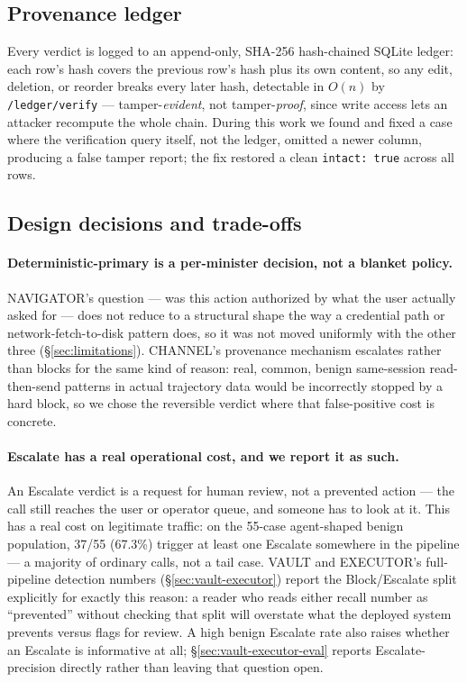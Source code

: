 \subsection{Provenance ledger}
\label{sec:provenance}

Every verdict is logged to an append-only, SHA-256 hash-chained SQLite
ledger: each row's hash covers the previous row's hash plus its own
content, so any edit, deletion, or reorder breaks every later hash,
detectable in $O(n)$ by \texttt{/ledger/verify} --- tamper-\emph{evident},
not tamper-\emph{proof}, since write access lets an attacker recompute the
whole chain. During this work we found and fixed a case where the
verification query itself, not the ledger, omitted a newer column,
producing a false tamper report; the fix restored a clean
\texttt{intact: true} across all rows.

\subsection{Design decisions and trade-offs}
\label{sec:design-tradeoffs}

\paragraph{Deterministic-primary is a per-minister decision, not a blanket
policy.} NAVIGATOR's question --- was this action authorized by what the
user actually asked for --- does not reduce to a structural shape the way
a credential path or network-fetch-to-disk pattern does, so it was not
moved uniformly with the other three (\S\ref{sec:limitations}). CHANNEL's
provenance mechanism escalates rather than blocks for the same kind of
reason: real, common, benign same-session read-then-send patterns in
actual trajectory data would be incorrectly stopped by a hard block, so we
chose the reversible verdict where that false-positive cost is concrete.

\paragraph{Escalate has a real operational cost, and we report it as
such.} An Escalate verdict is a request for human review, not a
prevented action --- the call still reaches the user or operator queue,
and someone has to look at it. This has a real cost on legitimate
traffic: on the 55-case agent-shaped benign population, 37/55 (67.3\%)
trigger at least one Escalate somewhere in the pipeline --- a majority
of ordinary calls, not a tail case. VAULT and EXECUTOR's full-pipeline
detection numbers (\S\ref{sec:vault-executor}) report the Block/Escalate
split explicitly for exactly this reason: a reader who reads either
recall number as ``prevented'' without checking that split will overstate
what the deployed system prevents versus flags for review. A high benign
Escalate rate also raises whether an Escalate is informative at all;
\S\ref{sec:vault-executor-eval} reports Escalate-precision directly rather
than leaving that question open.

